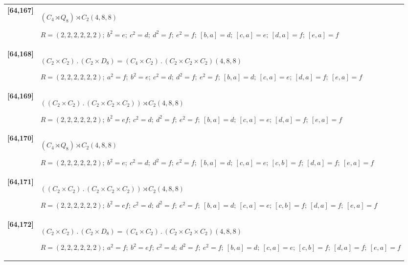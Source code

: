 \documentclass[UTF8,fontset=fandol,11pt,a4paper]{ctexart}
\begin{document}
\begin{longtable}{@{}p{17mm}>{\raggedright\arraybackslash}p{141mm}@{}}
\textbf{[64,167]} & $(C_{4}\rtimes Q_{8})\rtimes C_{2}$\quad $(4,8,8)$\par\(R=(2,2,2,2,2,2);\allowbreak\ b^{2}=e;\allowbreak\ c^{2}=d;\allowbreak\ d^{2}=f;\allowbreak\ e^{2}=f;\allowbreak\ [b,a]=d;\allowbreak\ [c,a]=e;\allowbreak\ [d,a]=f;\allowbreak\ [e,a]=f\)\\[3pt]

\textbf{[64,168]} & $(C_{2}\times C_{2})\mathbin{.} (C_{2}\times D_{8}) = (C_{4}\times C_{2})\mathbin{.} (C_{2}\times C_{2}\times C_{2})$\quad $(4,8,8)$\par\(R=(2,2,2,2,2,2);\allowbreak\ a^{2}=f;\allowbreak\ b^{2}=e;\allowbreak\ c^{2}=d;\allowbreak\ d^{2}=f;\allowbreak\ e^{2}=f;\allowbreak\ [b,a]=d;\allowbreak\ [c,a]=e;\allowbreak\ [d,a]=f;\allowbreak\ [e,a]=f\)\\[3pt]

\textbf{[64,169]} & $((C_{2}\times C_{2})\mathbin{.} (C_{2}\times C_{2}\times C_{2}))\rtimes C_{2}$\quad $(4,8,8)$\par\(R=(2,2,2,2,2,2);\allowbreak\ b^{2}=ef;\allowbreak\ c^{2}=d;\allowbreak\ d^{2}=f;\allowbreak\ e^{2}=f;\allowbreak\ [b,a]=d;\allowbreak\ [c,a]=e;\allowbreak\ [d,a]=f;\allowbreak\ [e,a]=f\)\\[3pt]

\textbf{[64,170]} & $(C_{4}\rtimes Q_{8})\rtimes C_{2}$\quad $(4,8,8)$\par\(R=(2,2,2,2,2,2);\allowbreak\ b^{2}=e;\allowbreak\ c^{2}=d;\allowbreak\ d^{2}=f;\allowbreak\ e^{2}=f;\allowbreak\ [b,a]=d;\allowbreak\ [c,a]=e;\allowbreak\ [c,b]=f;\allowbreak\ [d,a]=f;\allowbreak\ [e,a]=f\)\\[3pt]

\textbf{[64,171]} & $((C_{2}\times C_{2})\mathbin{.} (C_{2}\times C_{2}\times C_{2}))\rtimes C_{2}$\quad $(4,8,8)$\par\(R=(2,2,2,2,2,2);\allowbreak\ b^{2}=ef;\allowbreak\ c^{2}=d;\allowbreak\ d^{2}=f;\allowbreak\ e^{2}=f;\allowbreak\ [b,a]=d;\allowbreak\ [c,a]=e;\allowbreak\ [c,b]=f;\allowbreak\ [d,a]=f;\allowbreak\ [e,a]=f\)\\[3pt]

\textbf{[64,172]} & $(C_{2}\times C_{2})\mathbin{.} (C_{2}\times D_{8}) = (C_{4}\times C_{2})\mathbin{.} (C_{2}\times C_{2}\times C_{2})$\quad $(4,8,8)$\par\(R=(2,2,2,2,2,2);\allowbreak\ a^{2}=f;\allowbreak\ b^{2}=ef;\allowbreak\ c^{2}=d;\allowbreak\ d^{2}=f;\allowbreak\ e^{2}=f;\allowbreak\ [b,a]=d;\allowbreak\ [c,a]=e;\allowbreak\ [c,b]=f;\allowbreak\ [d,a]=f;\allowbreak\ [e,a]=f\)\\[3pt]


\end{longtable}
\end{document}
